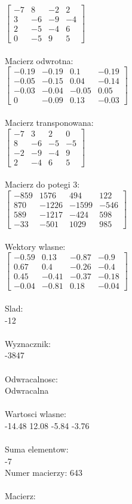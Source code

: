 \documentclass[a4paper,12pt]{article}
\begin{document}
$\begin{bmatrix} -7&8&-2&2\\3&-6&-9&-4\\2&-5&-4&6\\0&-5&9&5 \end{bmatrix}$
\\
\\
Macierz odwrotna:\\

$\begin{bmatrix} -0.19&-0.19&0.1&-0.19\\-0.05&-0.15&0.04&-0.14\\-0.03&-0.04&-0.05&0.05\\0&-0.09&0.13&-0.03 \end{bmatrix}$
\\
\\
Macierz transponowana:\\

$\begin{bmatrix} -7&3&2&0\\8&-6&-5&-5\\-2&-9&-4&9\\2&-4&6&5 \end{bmatrix}$
\\
\\
Macierz do potegi 3:\\

$\begin{bmatrix} -859&1576&494&122\\870&-1226&-1599&-546\\589&-1217&-424&598\\-33&-501&1029&985 \end{bmatrix}$
\\
\\
Wektory wlasne:\\

$\begin{bmatrix} -0.59&0.13&-0.87&-0.9\\0.67&0.4&-0.26&-0.4\\0.45&-0.41&-0.37&-0.18\\-0.04&-0.81&0.18&-0.04 \end{bmatrix}$
\\
\\
Slad:\\
-12
\\
\\
Wyznacznik:\\
-3847
\\
\\
Odwracalnosc:\\
Odwracalna
\\
\\
Wartosci wlasne:\\
-14.48 12.08 -5.84 -3.76
\\
\\
Suma elementow:\\
-7
\\
\newpage
Numer macierzy:
643
\\
\\
Macierz:\\
\end{document}
